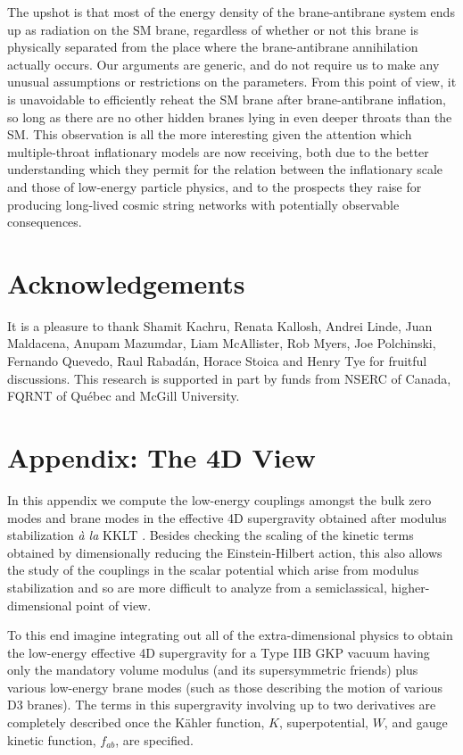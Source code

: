 \documentclass[12pt]{JHEP3}
\begin{document}
The upshot is that most of the energy density of the
brane-antibrane system ends up as radiation on the SM brane,
regardless of whether or not this brane is physically separated
from the place where the brane-antibrane annihilation actually
occurs. Our arguments are generic, and do not require us to make
any unusual assumptions or restrictions on the parameters. From
this point of view, it is unavoidable to efficiently reheat the SM
brane after brane-antibrane inflation, so long as there are no
other hidden branes lying in even deeper throats than the SM. This
observation is all the more interesting given the attention which
multiple-throat inflationary models are now receiving, both due to
the better understanding which they permit for the relation
between the inflationary scale and those of low-energy particle
physics, and to the prospects they raise for producing long-lived
cosmic string networks with potentially observable consequences.

\section*{Acknowledgements}
It is a pleasure to thank Shamit Kachru, Renata Kallosh, Andrei
Linde, Juan Maldacena, Anupam Mazumdar, Liam McAllister, Rob
Myers, Joe Polchinski, Fernando Quevedo, Raul Rabad\'an, Horace
Stoica and Henry Tye for fruitful discussions. This research is
supported in part by funds from NSERC of Canada, FQRNT of Qu\'ebec
and McGill University.

\section{Appendix: The 4D View}

In this appendix we compute the low-energy couplings amongst the
bulk zero modes and brane modes in the effective 4D supergravity
obtained after modulus stabilization {\it \`a la} KKLT \cite{kklt}.
Besides checking the scaling of the kinetic terms obtained by
dimensionally reducing the Einstein-Hilbert action, this also
allows the study of the couplings in the scalar potential which
arise from modulus stabilization and so are more difficult to
analyze from a semiclassical, higher-dimensional point of view.

To this end imagine integrating out all of the extra-dimensional
physics to obtain the low-energy effective 4D supergravity for a
Type IIB GKP vacuum having only the mandatory volume modulus (and
its supersymmetric friends) plus various low-energy brane modes
(such as those describing the motion of various D3 branes). The
terms in this supergravity involving up to two derivatives are
completely described once the K\"ahler function, $K$,
superpotential, $W$, and gauge kinetic function, $f_{ab}$, are
specified.
\end{document}
